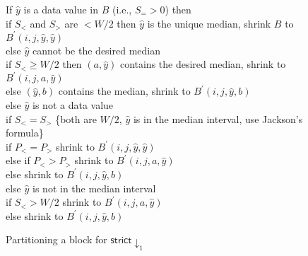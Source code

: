 \documentclass[11pt]{article}
\newlength{\Ainlength}
\newlength{\Aintemp}
\newcommand{\Ain}[1]{\setlength{\Aintemp}{0.5in}\addtolength{\Aintemp}{#1\Ainlength} \hspace*{\Aintemp}}
\begin{document}
\begin{figure}
\noindent
\Ain{0} If $\hat{y}$ is a data value in $B$ (i.e., $S_= > 0$) then\\
      \Ain{1} if $S_<$ and $S_>$ are $< W/2$ then $\hat{y}$ is the unique median, shrink $B$ to $B^\prime(i,j,\hat{y},\hat{y})$\\
      \Ain{1}else $\hat{y}$ cannot be the desired median\\
           \Ain{2} if $S_< \geq W/2$ then $(a,\hat{y})$ contains the desired median, shrink to $B^\prime(i,j,a,\hat{y})$ \\
           \Ain{2} else $(\hat{y},b)$ contains the median, shrink to $B^\prime(i,j,\hat{y}, b)$\\
\Ain{0} else $\hat{y}$ is not a data value\\
      \Ain{1}if $S_< = S_>$ \{both are $W/2$, $\hat{y}$ is in the median interval, use Jackson's formula\}\\
           \Ain{2} if $P_< = P_>$ shrink to $B^\prime(i,j,\hat{y},\hat{y})$\\
           \Ain{2} else if $P_<  > P_>$ shrink to $B^\prime(i,j,a,\hat{y})$\\
           \Ain{2} else shrink to $B^\prime(i,j,\hat{y},b)$\\
      \Ain{1} else $\hat{y}$ is not in the median interval\\
           \Ain{2} if $S_< > W/2$ shrink to $B^\prime(i,j,a,\hat{y})$ \\
           \Ain{2} else shrink to $B^\prime(i,j,\hat{y},b)$

\caption{Partitioning a block for $\mathsf{strict}{\downarrow}_1$}  \label{fig:partition}

\hrulefill
\end{figure}
\end{document}
